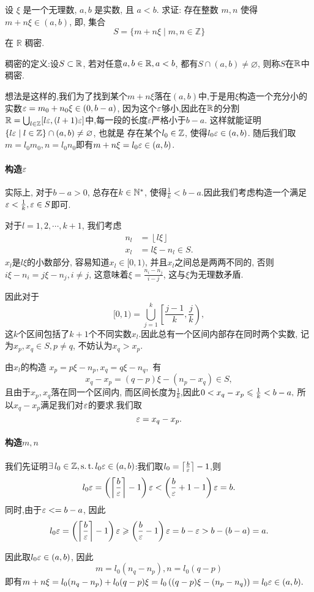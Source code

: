\begin{exercise}[1.C.16]
    设 $\xi$ 是一个无理数,  $a, b$ 是实数,  且 $a<b$. 求证: 存在整数 $m, n$ 使得 $m+n\xi \in (a, b)$,  即,  集合
    $$ S = \{m+n\xi \mid m,  n \in \mathbb{Z}\} $$
    在 $\mathbb{R}$ 稠密.
\end{exercise}
\begin{solution}
稠密的定义:设$S\subset \mathbb{R}$, 若对任意$a, b\in\mathbb{R}, a<b$, 都有$S\cap(a, b)\neq\varnothing$, 则称$S$在$\mathbb{R}$中稠密.

    想法是这样的,我们为了找到某个$m+n\xi$落在$(a, b)$中,于是用$\xi$构造一个充分小的实数$\varepsilon = m_0 + n_0 \xi \in \left( 0, {b-a} \right)$, 因为这个$\varepsilon$够小,因此在$\mathbb{R}$的分割$\mathbb{R}=\bigcup_{l\in\mathbb{Z}}[l\varepsilon, (l+1)\varepsilon]$中,每一段的长度$\varepsilon$严格小于$b-a$.
    这样就能证明$\{l \varepsilon \mid l\in\mathbb{Z}\} \cap (a, b) \neq \varnothing$, 也就是
    存在某个$l_0\in\mathbb{Z}$, 使得$l_0\varepsilon\in(a, b)$.
    随后我们取$m=l_0m_0, n=l_0n_0$即有$m+n\xi=l_0\varepsilon\in(a, b)$.

    \paragraph*{构造$\varepsilon$}

    实际上, 对于$b-a>0$, 总存在$k\in\mathbb{N}^*$, 使得$\frac{1}{k}<{b-a}$.因此我们考虑构造一个满足$\varepsilon<\frac{1}{k}, \varepsilon\in S$即可.

    对于$l=1, 2, \cdots, k+1$, 我们考虑
    \begin{align*}
        n_l & =\left\lfloor l\xi \right\rfloor \\
        x_l & =l\xi-n_l \in S.
    \end{align*}
    $x_l$是$l\xi$的小数部分, 容易知道$x_l\in[0, 1)$, 并且$x_l$之间总是两两不同的, 否则$i\xi-n_i=j\xi-n_j, i\neq j$, 这意味着$\xi=\frac{n_i-n_j}{i-j}$, 这与$\xi$为无理数矛盾.

    因此对于$$[0, 1)=\bigcup_{j=1}^{k} \left[ \frac{j-1}{k}, \frac{j}{k} \right), $$
    这$k$个区间包括了$k+1$个不同实数$x_l$.因此总有一个区间内部存在同时两个实数, 记为$x_p, x_q \in S, p\neq q$, 不妨认为$x_q>x_p$.

    由$x_l$的构造 $x_p=p\xi-n_p, x_q=q\xi-n_q,$
    有$$ x_q-x_p=(q-p)\xi-(n_p-x_q)\in S,$$
    且由于$x_p, x_q$落在同一个区间内, 而区间长度为$\frac{1}{k}$,因此$0<x_q-x_p\leqslant\frac{1}{k}< {b-a},$
    所以$x_q-x_p$满足我们对$\varepsilon$的要求.我们取$$\varepsilon=x_q-x_p.$$

    \paragraph*{构造$m, n$}

    我们先证明$\exists l_0\in\Z, \st l_0\ve\in(a, b)$:我们取$l_0 = \left\lceil \frac{b}{\varepsilon} \right\rceil - 1$,则$$l_0 \varepsilon = \left(\left\lceil \frac{b}{\varepsilon} \right\rceil - 1\right)\varepsilon < \left(\frac{b}{\varepsilon} + 1 - 1\right)\varepsilon = b.$$
    同时,由于$\varepsilon < ={b-a}$, 因此$$l_0 \varepsilon = \left(\left\lceil \frac{b}{\varepsilon} \right\rceil - 1\right)\varepsilon \geqslant \left(\frac{b}{\varepsilon} - 1\right)\varepsilon = b - \varepsilon > b - (b-a) = a.$$

    因此取$l_0\varepsilon\in(a, b)$, 因此$$m=l_0(n_q-n_p), n=l_0(q-p)$$
    即有$m+n\xi=l_0 (n_q-n_p)+l_0(q-p)\xi=l_0 \left( (q-p)\xi-(n_p-n_q) \right)=l_0\varepsilon\in(a, b).$
\end{solution}
